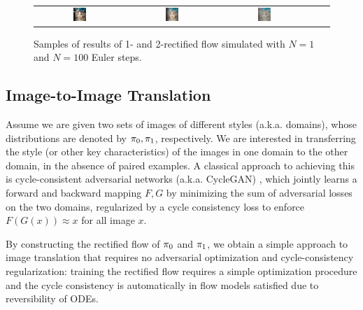 \begin{figure}[h]
\begin{tabular}{ccccc}
     \includegraphics[width=0.16\textwidth]{arxiv_figures/translation_nfe/image_2_3.png} &
     \includegraphics[width=0.16\textwidth]{arxiv_figures/translation_nfe/image_2_4.png} &
     \includegraphics[width=0.16\textwidth]{arxiv_figures/translation_nfe/image_2_5.png}\\
\end{tabular}
    \caption{Samples of results of 1- and 2-rectified flow simulated with $N=1$ and $N=100$ Euler steps.
    }
    \label{fig:met2cat_reflow}
\end{figure}

\subsection{Image-to-Image Translation}


Assume we are given two sets of images of different styles (a.k.a. domains),  
whose distributions are denoted by ${\pi}_0,{\pi}_1$, respectively. 
We are interested in transferring the style (or other key characteristics) of the images in one domain to the other domain, in the absence of paired examples. 
A classical approach to achieving this is  
 cycle-consistent adversarial networks (a.k.a. CycleGAN) \citep{cyclegan, isola2017image}, 
 which jointly learns a forward and backward mapping $F,G$ 
 by minimizing the sum of adversarial losses on the two domains, regularized by a cycle consistency loss to enforce $F(G(x))\approx x$ for all image $x$. 

 
By constructing the rectified flow of ${\pi}_0$ and ${\pi}_1$,  
we obtain a simple approach to image translation that requires no adversarial optimization and cycle-consistency regularization:  
training the rectified flow requires a simple optimization procedure and the cycle consistency is automatically in  flow  models satisfied due to reversibility of ODEs.  

